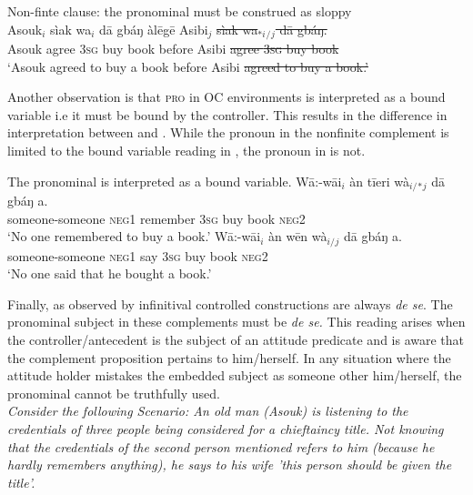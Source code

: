 \documentclass[output=paper,colorlinks,citecolor=brown]{langscibook}
\begin{document}
\ea%
    \label{ex:sulemana:21}
    Non-finte clause: the pronominal must be construed as sloppy\\
    \gll    Asouk$_i$ sìak wa$_i$ dā gbáŋ àlēgē Asibi$_j$ {\sout{sìak wa$_{*i}${}$_/${}$_j$ dā gbáŋ.}} \\
            Asouk agree \textsc{3sg} buy book before Asibi {\sout{agree \textsc{3sg} buy book}}\\
    \glt    `Asouk agreed to buy a book before Asibi {\sout{agreed to buy a book.'}}
\z

Another observation is that \textsc{pro} in OC environments is interpreted as a bound variable i.e it must be bound by the controller. This results in the difference in interpretation between  and . While the pronoun in the nonfinite complement is limited to the bound variable reading in , the pronoun in  is not. 

\ea%
    \label{ex:sulemana:22}
    The pronominal is interpreted as a bound variable.
    \ea%
    \label{ex:sulemana:22a}
    \gll    Wā:-wāi$_i$ àn tīeri  wà$_{i/}${}$_*${}$_j$ dā gbáŋ a. \\
            someone-someone  \textsc{neg1} remember \textsc{3sg} buy book  \textsc{neg2} \\
    \glt    `No one remembered to buy a book.' 
    \ex%
    \label{ex:sulemana:22b}
    \gll    Wā:-wāi$_i$ àn wēn  wà$_{i/}${}$_j$ dā gbáŋ a. \\
            someone-someone \textsc{neg1} say \textsc{3sg} buy book  \textsc{neg2}\\
    \glt    `No one said that he bought a book.' 
    \z
\z

Finally, as observed by \citet{Chierchia1989} infinitival controlled constructions are always {\it{de se}}. The pronominal subject in these complements must be {\it{de se.}} This reading arises when the controller/antecedent is the subject of an attitude predicate and is aware that the complement proposition pertains to him/herself. In any situation where the attitude holder mistakes the embedded subject as someone other him/herself, the pronominal cannot be truthfully used.\\

{\it{Consider the following Scenario: An old man (Asouk) is listening to the credentials of three people being considered for a chieftaincy title. Not knowing that the credentials of the second person mentioned refers to him (because he hardly remembers anything), he says to his wife 'this person should be given the title'.}}\\
\end{document}
